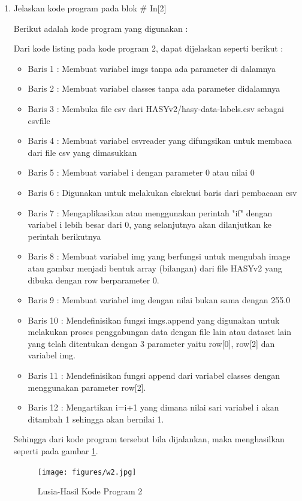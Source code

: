 \begin{enumerate}
\item Jelaskan kode program pada blok \# In[2]
	\par Berikut adalah kode program yang digunakan :
	
	\par Dari kode listing pada kode program 2, dapat dijelaskan seperti berikut :
	\begin{itemize}
	\item Baris 1	: Membuat variabel imgs tanpa ada parameter di dalamnya
	\item Baris 2	: Membuat variabel classes tanpa ada parameter didalamnya
	\item Baris 3	: Membuka file csv dari HASYv2/hasy-data-labels.csv sebagai csvfile
	\item Baris 4	: Membuat variabel csvreader yang difungsikan untuk membaca dari file csv yang dimasukkan
	\item Baris 5	: Membuat variabel i dengan parameter 0 atau nilai 0
	\item Baris 6	: Digunakan untuk melakukan eksekusi baris dari pembacaan csv 
	\item Baris 7	: Mengaplikasikan atau menggunakan perintah "if" dengan variabel i lebih besar dari 0, yang selanjutnya akan dilanjutkan ke perintah berikutnya
	\item Baris 8	: Membuat variabel img yang berfungsi untuk mengubah image atau gambar menjadi bentuk array (bilangan) dari file HASYv2 yang dibuka dengan row berparameter 0.
	\item Baris 9	: Membuat variabel img dengan nilai bukan sama dengan 255.0
	\item Baris 10	: Mendefinisikan fungsi imgs.append yang digunakan untuk melakukan proses penggabungan data dengan file lain atau dataset lain yang telah ditentukan dengan 3 parameter yaitu row[0], row[2] dan variabel img.
	\item Baris 11	: Mendefinisikan fungsi append dari variabel classes dengan menggunakan parameter row[2].
	\item Baris 12	: Mengartikan i=i+1 yang dimana nilai sari variabel i akan ditambah 1 sehingga akan bernilai 1.
	\end{itemize}
	\par Sehingga dari kode program tersebut bila dijalankan, maka menghasilkan seperti pada gambar \ref{7B2}.
		\begin{figure}[!hbtp]
		\centering
		\texttt{[image: figures/w2.jpg]}
		\caption{Lusia-Hasil Kode Program 2}
		\label{7B2}
		\end{figure}
	

\end{enumerate}

